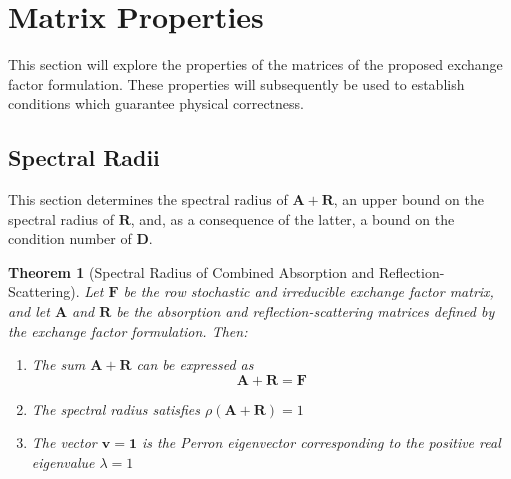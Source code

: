 \documentclass[preprint,1p,times]{elsarticle}
\theoremstyle{plain}
\newtheorem{theorem}{Theorem}[section]
\theoremstyle{definition}
\theoremstyle{remark}
\begin{document}
\section{Matrix Properties}
\label{sec:matrix_props}

This section will explore the properties of the matrices of the proposed exchange factor formulation. These properties will subsequently be used to establish conditions which guarantee physical correctness.

\subsection{Spectral Radii}

This section determines the spectral radius of $\mathbf{A}+\mathbf{R}$, an upper bound on the spectral radius of $\mathbf{R}$, and, as a consequence of the latter, a bound on the condition number of $\mathbf{D}$.

\begin{theorem}[Spectral Radius of Combined Absorption and Reflection-Scattering]
\label{thm:spectral_radius_unity}
Let $\mathbf{F}$ be the row stochastic and irreducible exchange factor matrix, and let $\mathbf{A}$ and $\mathbf{R}$ be the absorption and reflection-scattering matrices defined by the exchange factor formulation. Then:
\begin{enumerate}
\item The sum $\mathbf{A} + \mathbf{R}$ can be expressed as
\begin{equation}
\mathbf{A} + \mathbf{R} = \mathbf{F}
\label{eq:A_plus_R_form}
\end{equation}
\item The spectral radius satisfies $\rho(\mathbf{A} + \mathbf{R}) = 1$
\item The vector $\mathbf{v} = \mathbf{1}$ is the Perron eigenvector corresponding to the positive real eigenvalue $\lambda = 1$
\end{enumerate}
\end{theorem}
\end{document}
